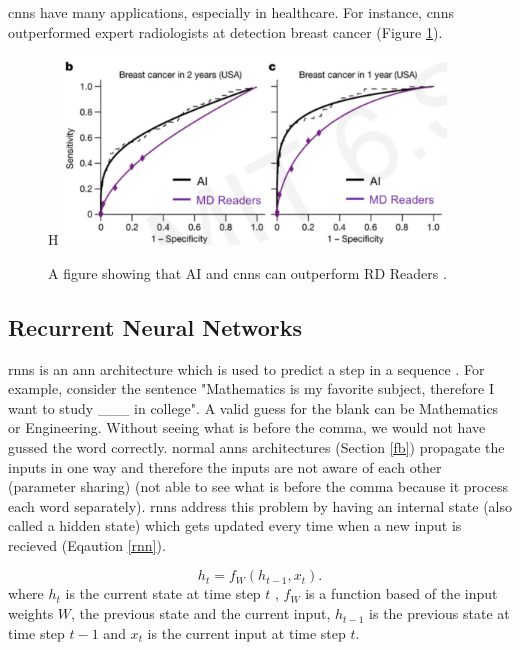 \documentclass[runningheads]{llncs}
\begin{document}
\gls{cnns} have many applications, especially in healthcare. For instance, 
\gls{cnns} outperformed expert radiologists at detection breast cancer \cite{mckinney2020international} (Figure \ref{can}).

\begin{figure}{H}
    \label{can}
    \centering
    \includegraphics[height=5cm]{cancer}
    \caption{A figure showing that AI and \gls{cnns} can outperform RD Readers \cite{mitlecthree}.}
\end{figure}



\subsection{Recurrent Neural Networks}

\gls{rnns} is an \gls{ann} architecture which is used to predict a step in a sequence \cite{hochreiter1997long}.
For example, consider the sentence "Mathematics is my favorite subject, therefore I want to study \_\_\_ in college".
A valid guess for the blank can be Mathematics or Engineering. Without seeing
what is before the comma, we would not have gussed the word correctly.
normal \gls{anns} architectures (Section \ref{fb}) propagate the inputs in one way and therefore 
the inputs are not aware of each other (parameter sharing) 
(not able to see what is before the comma because it process each word separately).
\gls{rnns} address this problem by having an internal state (also called a hidden state) which gets 
updated every time when a new input is recieved (Eqaution \ref{rnn}). 

\begin{equation}
    \label{rnn}
    h_{t} = f_{W}(h_{t-1}, x_{t}).
\end{equation}
where $h_{t}$ is the current state at time step $t$ , $f_{W}$ is a function
based of the input weights $W$, the previous state and the current input,  
$h_{t-1}$ is the previous state at time step $t-1$ and $x_{t}$ is the current input at time step $t$. 
\end{document}
